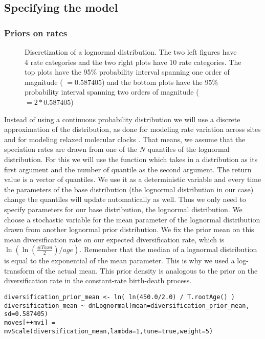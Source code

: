 \subsection{Specifying the model}

\subsubsection{Priors on rates}
\begin{figure}[htbp!]
\centering
{}
\caption{\small Discretization of a lognormal distribution. The two left figures have 4 rate categories and the two right plots have 10 rate categories. The top plots have the 95\% probability interval spanning one order of magnitude ( $=0.587405$) and the bottom plots have the 95\% probability interval spanning two orders of magnitude ( $=2*0.587405$)}
\label{fig:BSBD_likelihood}
\end{figure}
Instead of using a continuous probability distribution we will use a discrete approximation of the distribution, as done for modeling rate variation across sites \citep{Yang1994a} and for modeling relaxed molecular clocks \citep{Drummond2006}.
That means, we assume that the speciation rates are drawn from one of the $N$ quantiles of the lognormal distribution.
For this we will use the function  which takes in a distribution as its first argument and the number of quantile as the second argument.
The return value is a vector of quantiles.
We use it as a deterministic variable and every time the parameters of the base distribution (\IE the lognormal distribution in our case) change the quantiles will update automatically as well.
Thus we only need to specify parameters for our base distribution, the lognormal distribution.
We choose a stochastic variable for the mean parameter of the lognormal distribution drawn from another lognormal prior distribution.
We fix the prior mean on this mean diversification rate on our expected diversification rate, which is $\ln( \ln(\frac{\#Taxa}{2})/age )$.
Remember that the median of a lognormal distribution is equal to the exponential of the mean parameter.
This is why we used a log-transform of the actual mean.
This prior density is analogous to the prior on the diversification rate in the constant-rate birth-death process.
{\tt \begin{snugshade*}
\begin{lstlisting}
diversification_prior_mean <- ln( ln(450.0/2.0) / T.rootAge() )
diversification_mean ~ dnLognormal(mean=diversification_prior_mean, sd=0.587405)
moves[++mvi] = mvScale(diversification_mean,lambda=1,tune=true,weight=5)
\end{lstlisting}
\end{snugshade*}}
